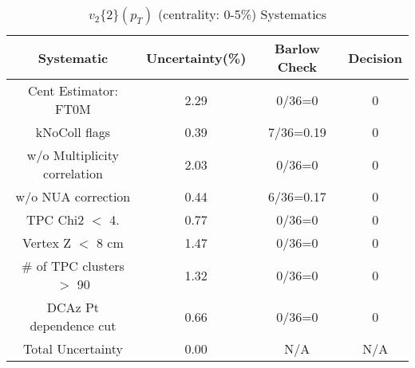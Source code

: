 \begin{table}[htbp]
\caption{$v_2\{2\}(p_{T})$ (centrality: 0-5\%) Systematics}
\label{tab:Sys_pTDiffv2}
\centering
\begin{tabular}{|c|c|c|c|}
\hline
Systematic & Uncertainty(\%) & Barlow Check & Decision \\
\hline
Cent Estimator: FT0M & 2.29 & 0/36=0 & 0 \\
kNoColl flags & 0.39 & 7/36=0.19 & 0 \\
w/o Multiplicity correlation & 2.03 & 0/36=0 & 0 \\
w/o NUA correction & 0.44 & 6/36=0.17 & 0 \\
TPC Chi2 $<$ 4. & 0.77 & 0/36=0 & 0 \\
Vertex Z $<$ 8 cm & 1.47 & 0/36=0 & 0 \\
\# of TPC clusters $>$ 90 & 1.32 & 0/36=0 & 0 \\
DCAz Pt dependence cut & 0.66 & 0/36=0 & 0 \\
\hline
Total Uncertainty & 0.00 & N/A & N/A \\
\hline
\end{tabular}
\end{table}
